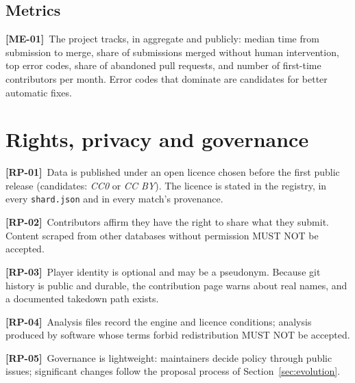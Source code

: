 \documentclass[11pt,a4paper]{article}
\newcommand{\kw}[1]{\textit{#1}\index{#1}}
\newcommand{\req}[2]{\par\smallskip\noindent\hypertarget{#1}{}\textbf{[#1]}\ #2\par}
\begin{document}
\subsection{Metrics}
\req{ME-01}{The project tracks, in aggregate and publicly: median time from submission to merge, share of submissions merged without human intervention, top error codes, share of abandoned pull requests, and number of first-time contributors per month. Error codes that dominate are candidates for better automatic fixes.}

\section{Rights, privacy and governance}\label{sec:rights}
\req{RP-01}{Data is published under an open licence chosen before the first public release (candidates: \kw{CC0} or \kw{CC BY}). The licence is stated in the registry, in every \texttt{shard.json} and in every match's provenance.}
\req{RP-02}{Contributors affirm they have the right to share what they submit. Content scraped from other databases without permission MUST NOT be accepted.}
\req{RP-03}{Player identity is optional and may be a pseudonym. Because git history is public and durable, the contribution page warns about real names, and a documented takedown path exists.}
\req{RP-04}{Analysis files record the engine and licence conditions; analysis produced by software whose terms forbid redistribution MUST NOT be accepted.}
\req{RP-05}{Governance is lightweight: maintainers decide policy through public issues; significant changes follow the proposal process of Section~\ref{sec:evolution}.}

\end{document}
